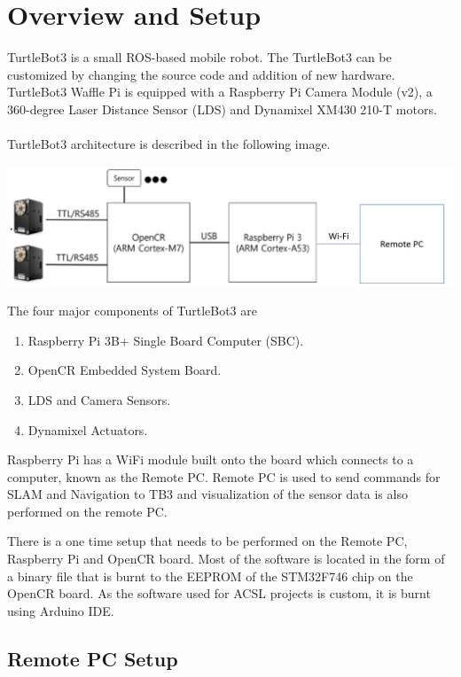 \documentclass[12]{article}
\begin{document}
\section{Overview and Setup}
TurtleBot3 is a small ROS-based mobile robot. The TurtleBot3 can be customized by changing the source code and addition of new hardware. TurtleBot3 Waffle Pi is equipped with a Raspberry Pi Camera Module (v2), a 360-degree Laser Distance Sensor (LDS) and Dynamixel XM430 210-T motors.\\\\
TurtleBot3 architecture is described in the following image.\\

\begin{center}
\includegraphics[width=0.7\linewidth]{images/tb3_architecture.png}\\
\end{center}

The four major components of TurtleBot3 are 
\begin{enumerate}
	\item {Raspberry Pi 3B+ Single Board Computer (SBC).}
	\item {OpenCR Embedded System Board.}
	\item {LDS and Camera Sensors.}
	\item {Dynamixel Actuators.}
\end{enumerate}

Raspberry Pi has a WiFi module built onto the board which connects to a computer, known as the Remote PC. Remote PC is used to send commands for SLAM and Navigation to TB3 and visualization of the sensor data is also performed on the remote PC.

There is a one time setup that needs to be performed on the Remote PC, Raspberry Pi and OpenCR board. Most of the software is located in the form of a binary file that is burnt to the EEPROM of the STM32F746 chip on the OpenCR board. As the software used for ACSL projects is custom, it is burnt using Arduino IDE.
 
\subsection{Remote PC Setup}
\end{document}
